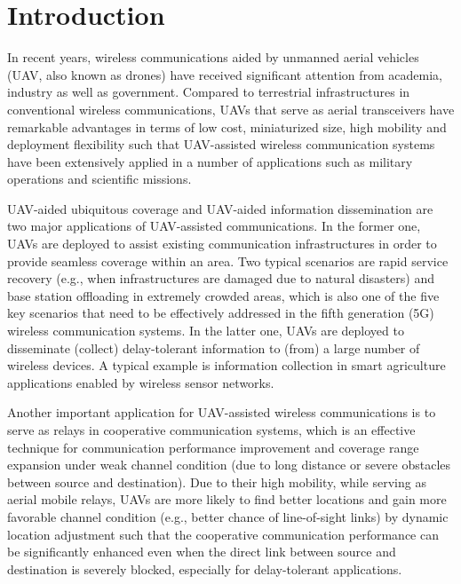 \documentclass[12pt, draftclsnofoot, onecolumn]{IEEEtran}
\begin{document}
\section{Introduction}
In recent years, wireless communications aided by unmanned aerial vehicles (UAV, also known as drones) have received significant attention from academia, industry as well as government\cite{5892898}. Compared to  terrestrial infrastructures in conventional wireless communications, UAVs that serve as aerial transceivers have remarkable advantages in terms of low cost, miniaturized size, high mobility and deployment flexibility such that UAV-assisted wireless communication systems have been extensively applied in a number of applications such as military operations and scientific missions.

UAV-aided ubiquitous coverage and UAV-aided information dissemination are two major applications of UAV-assisted communications\cite{7470933}. In the former one, UAVs are deployed to assist existing communication infrastructures in order to provide seamless coverage within an area. Two typical scenarios are rapid service recovery (e.g., when infrastructures are damaged due to natural disasters\cite{6766080}) and base station offloading in extremely crowded areas, which is also one of the five key scenarios that need to be effectively addressed in the fifth generation (5G) wireless communication systems\cite{6815890}. In the latter one, UAVs are deployed to disseminate (collect) delay-tolerant information to (from) a large number of wireless devices. A typical example is information collection in smart agriculture applications enabled by wireless sensor networks.

Another important application for UAV-assisted wireless communications is to serve as relays in cooperative communication systems, which is an effective technique for communication performance improvement and coverage range expansion under weak channel condition (due to long distance or severe obstacles between source and destination). Due to their high mobility, while serving as aerial mobile relays, UAVs are more likely to find better locations and gain more favorable channel condition (e.g., better chance of line-of-sight links) by dynamic location adjustment such that the cooperative communication performance can be significantly enhanced even when the direct link between source and destination is severely blocked, especially for delay-tolerant applications. 
\end{document}
